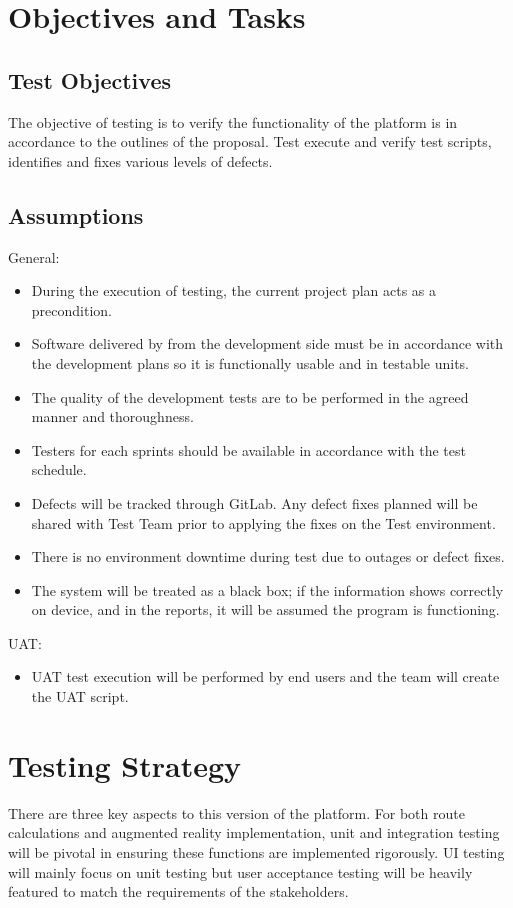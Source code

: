 \section{Objectives and Tasks}
\subsection{Test Objectives}
The objective of testing is to verify the functionality of the platform is in accordance to the outlines of the proposal. Test execute and verify test scripts, identifies and fixes various levels of defects.

\subsection{Assumptions}
General:
\begin{itemize}
    \item During the execution of testing, the current project plan acts as a precondition.
    \item Software delivered by from the development side must be in accordance with the development plans so it is functionally usable and in testable units. 
    \item The quality of the development tests are to be performed in the agreed manner and thoroughness.
    \item Testers for each sprints should be available in accordance with the test schedule. 
    \item Defects will be tracked through GitLab. Any defect fixes planned will be shared with Test Team prior to applying the fixes on the Test environment.
    \item There is no environment downtime during test due to outages or defect fixes.
    \item The system will be treated as a black box; if the information shows correctly on device, and in the reports, it will be assumed the program is functioning.
\end{itemize}

UAT:
\begin{itemize}
    \item UAT test execution will be performed by end users and the team will create the UAT script.
\end{itemize}

\section{Testing Strategy}
There are three key aspects to this version of the platform. For both route calculations and augmented reality implementation, unit and integration testing will be pivotal in ensuring these functions are implemented rigorously. UI testing will mainly focus on unit testing but user acceptance testing will be heavily featured to match the requirements of the stakeholders.

